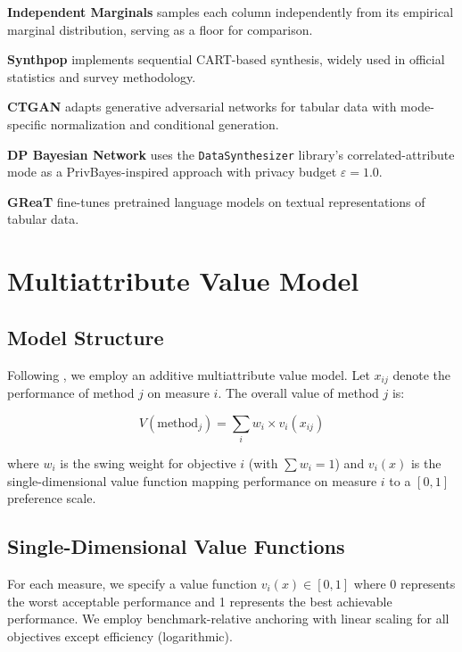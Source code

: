 \documentclass[12pt,a4paper]{article}
\begin{document}
\textbf{Independent Marginals} samples each column independently from its empirical marginal distribution, serving as a floor for comparison.

\textbf{Synthpop} \citep{nowok2016synthpop} implements sequential CART-based synthesis, widely used in official statistics and survey methodology.

\textbf{CTGAN} \citep{xu2019modeling} adapts generative adversarial networks for tabular data with mode-specific normalization and conditional generation.

\textbf{DP Bayesian Network} uses the \texttt{DataSynthesizer} library's correlated-attribute mode as a PrivBayes-inspired approach \citep{zhang2017privbayes} with privacy budget $\varepsilon = 1.0$.

\textbf{GReaT} \citep{borisov2023language} fine-tunes pretrained language models on textual representations of tabular data.

\section{Multiattribute Value Model}

\subsection{Model Structure}

Following \citet{keeney1976decisions}, we employ an additive multiattribute value model. Let $x_{ij}$ denote the performance of method $j$ on measure $i$. The overall value of method $j$ is:

\begin{equation}
V(\text{method}_j) = \sum_i w_i \times v_i(x_{ij})
\end{equation}

where $w_i$ is the swing weight for objective $i$ (with $\sum w_i = 1$) and $v_i(x)$ is the single-dimensional value function mapping performance on measure $i$ to a $[0,1]$ preference scale.

\subsection{Single-Dimensional Value Functions}

For each measure, we specify a value function $v_i(x) \in [0,1]$ where 0 represents the worst acceptable performance and 1 represents the best achievable performance. We employ benchmark-relative anchoring with linear scaling for all objectives except efficiency (logarithmic).
\end{document}
